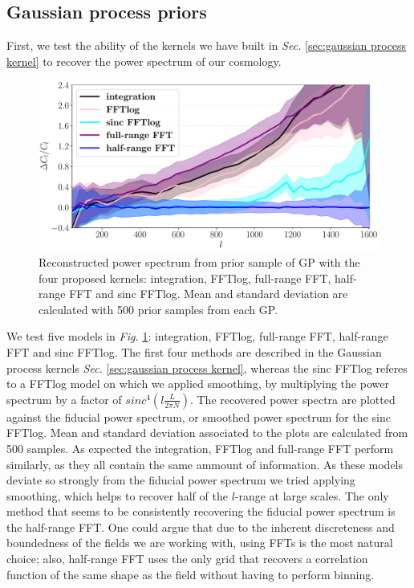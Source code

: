 \subsection{Gaussian process priors}
\label{sec:gaussian process priors}
First, we test the ability of the kernels we have built in \textit{Sec. }\ref{sec:gaussian process kernel} to recover the power spectrum of our cosmology.  
\begin{figure}[h]
    \centering
    \includegraphics[width=\textwidth]{images/3_kernel_comparison.pdf}
    \caption{\label{fig:check methods} Reconstructed power spectrum from prior sample of GP with the four proposed kernels: integration, FFTlog, full-range FFT, half-range FFT and sinc FFTlog. Mean and standard deviation are calculated with 500 prior samples from each GP. }
\end{figure}
We test five models in \textit{Fig. }\ref{fig:check methods}: integration, FFTlog, full-range FFT, half-range FFT and sinc FFTlog. The first four methods are described in the Gaussian process kernels \textit{Sec. }\ref{sec:gaussian process kernel}, whereas the sinc FFTlog referes to a FFTlog model on which we applied smoothing, by multiplying the power spectrum by a factor of $sinc^4(l\frac{L}{2\pi N})$. The recovered power spectra are plotted against the fiducial power spectrum, or smoothed power spectrum for the sinc FFTlog. Mean and standard deviation associated to the plots are calculated from 500 samples. As expected the integration, FFTlog and full-range FFT perform similarly, as they all contain the same ammount of information. As these models deviate so strongly from the fiducial power spectrum we tried applying smoothing, which helps to recover half of the $l$-range at large scales. The only method that seems to be consistently recovering the fiducial power spectrum is the half-range FFT. One could argue that due to the inherent discreteness and boundedness of the fields we are working with, using FFTs is the most natural choice; also, half-range FFT uses the only grid that recovers a correlation function of the same shape as the field without having to perform binning.
